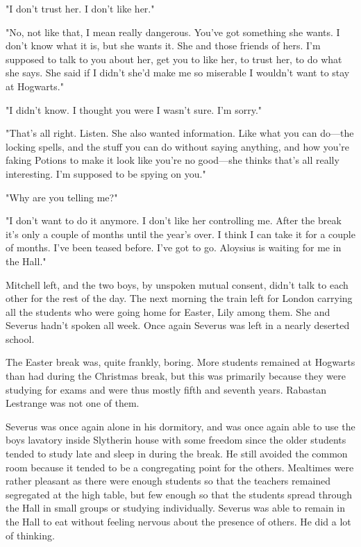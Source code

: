 "I don't{\el} trust her. I don't{\el} like her."

"No, not like that, I mean really dangerous. You've got something she wants. I don't know what it is, but she wants it. She and those friends of hers. I'm supposed to talk to you about her, get you to like her, to trust her, to do what she says. She said if I didn't she'd make me so miserable I wouldn't want to stay at Hogwarts."

"I didn't{\el} know. I thought you were{\el} I wasn't sure. I'm sorry."

"That's all right. Listen. She also wanted information. Like what you can do—the locking spells, and the stuff you can do without saying anything, and how you're faking Potions to make it look like you're no good—she thinks that's all really interesting. I'm supposed to be spying on you."

"Why are you{\el} telling me?"

"I don't want to do it anymore. I don't like her controlling me. After the break it's only a couple of months until the year's over. I think I can take it for a couple of months. I've been teased before. I've got to go. Aloysius is waiting for me in the Hall."

Mitchell left, and the two boys, by unspoken mutual consent, didn't talk to each other for the rest of the day. The next morning the train left for London carrying all the students who were going home for Easter, Lily among them. She and Severus hadn't spoken all week. Once again Severus was left in a nearly deserted school.

The Easter break was, quite frankly, boring. More students remained at Hogwarts than had during the Christmas break, but this was primarily because they were studying for exams and were thus mostly fifth and seventh years. Rabastan Lestrange was not one of them.

Severus was once again alone in his dormitory, and was once again able to use the boys lavatory inside Slytherin house with some freedom since the older students tended to study late and sleep in during the break. He still avoided the common room because it tended to be a congregating point for the others. Mealtimes were rather pleasant as there were enough students so that the teachers remained segregated at the high table, but few enough so that the students spread through the Hall in small groups or studying individually. Severus was able to remain in the Hall to eat without feeling nervous about the presence of others. He did a lot of thinking.

